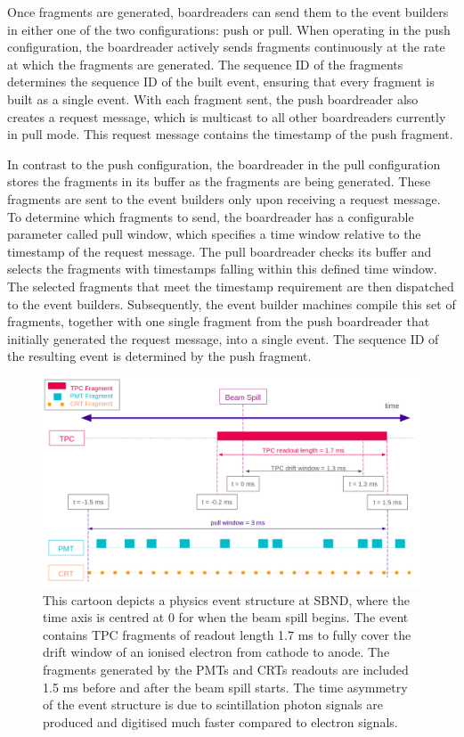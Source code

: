 Once fragments are generated, boardreaders can send them to the event builders in either one of the two configurations: push or pull. 
When operating in the push configuration, the boardreader actively sends fragments continuously at the rate at which the fragments are generated.
The sequence ID of the fragments determines the sequence ID of the built event, ensuring  that every fragment is built as a single event.
With each fragment sent, the push boardreader also creates a request message, which is multicast to all other boardreaders currently in pull mode.
This request message contains the timestamp of the push fragment. 

In contrast to the push configuration, the boardreader in the pull configuration stores the fragments in its buffer as the fragments are being generated.
These fragments are sent to the event builders only upon receiving a request message.
To determine which fragments to send, the boardreader has a configurable parameter called pull window, which specifies a time window relative to the timestamp of the request message.
The pull boardreader checks its buffer and selects the fragments with timestamps falling within this defined time window.
The selected fragments that meet the timestamp requirement are then dispatched to the event builders.
Subsequently, the event builder machines compile this set of fragments, together with one single fragment from the push boardreader that initially generated the request message, into a single event.
The sequence ID of the resulting event is determined by the push fragment.

\begin{figure}[htbp!] 
\centering    
\includegraphics[width=1.0\textwidth]{SBND_Event_Structure}
\caption[SBND_Event_Structure]{This cartoon depicts a physics event structure at SBND, where the time axis is centred at 0 for when the beam spill begins. The event contains TPC fragments of readout length 1.7 ms to fully cover the drift window of an ionised electron from cathode to anode. The fragments generated by the PMTs and CRTs readouts are included 1.5 ms before and after the beam spill starts. The time asymmetry of the event structure is due to scintillation photon signals are produced and digitised much faster compared to electron signals.}
\label{fig:sbnd_event_structure}
\end{figure}

